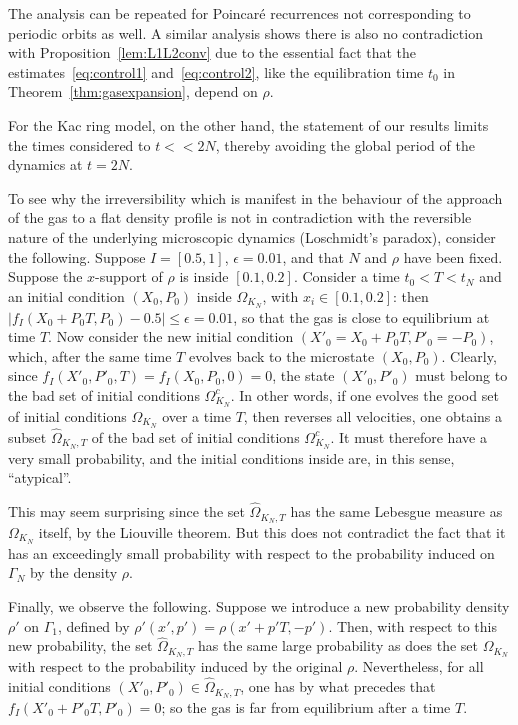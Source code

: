 \documentclass{article}
\numberwithin{equation}{section}
\begin{document}
The analysis can be repeated for Poincar\'e recurrences not corresponding to periodic orbits as well. A similar analysis shows there is also no contradiction with Proposition~\ref{lem:L1L2conv} due to the essential fact that the estimates~\eqref{eq:control1} and~\eqref{eq:control2}, like the equilibration time $t_0$ in Theorem~\ref{thm:gasexpansion}, depend on $\rho$.

For the Kac ring model, on the other hand, the statement of our results limits the times considered to $t<< 2N$, thereby avoiding the global period of the dynamics at $t=2N$.

To see why the irreversibility which is manifest in the behaviour of the approach of the gas to a flat density profile is not in contradiction with the reversible nature of the underlying microscopic dynamics (Loschmidt's paradox), consider the following. Suppose $I=[0.5, 1]$, $\epsilon=0.01$, and that $N$ and $\rho$ have been fixed. Suppose the $x$-support of $\rho$ is inside $[0.1, 0.2]$. Consider a time $t_0<T<t_N$ and an initial condition $(X_0, P_0)$ inside $\Omega_{K_N}$, with $x_i\in[0.1, 0.2]$: then $|f_I(X_0+P_0T, P_0)-0.5|\leq \epsilon=0.01$,  so that the gas is close to equilibrium at time $T$. Now consider the new initial condition $(X'_0=X_0+P_0T, P'_0=-P_0)$, which, after the same time $T$ evolves back to the microstate $(X_0, P_0)$. Clearly, since $f_I(X'_0, P'_0, T)=f_I(X_0, P_0, 0)=0$, the state $(X'_0, P'_0)$ must belong to the bad set of initial conditions $\Omega_{K_N}^c$. In other words, if one evolves the good set of initial conditions $\Omega_{K_N}$ over a time $T$, then reverses all velocities, one obtains a subset $\widehat\Omega_{K_N, T}$ of the bad set of initial conditions $\Omega^c_{K_N}$. It must therefore have a very small probability, and the initial conditions inside are, in this sense, ``atypical''.

This may seem surprising since the set $\widehat\Omega_{K_N, T}$ has the same Lebesgue measure as $\Omega_{K_N}$ itself, by the Liouville theorem. But this does not contradict the fact that it has an exceedingly small probability with respect to the probability induced on $\Gamma_N$ by the density $\rho$.

Finally, we observe the following. Suppose we introduce a new probability density$\rho'$  on $\Gamma_1$, defined by $\rho'(x',p')=\rho(x'+p'T,-p')$. Then, with respect to this new probability, the set $\widehat\Omega_{K_N, T}$ has the same large probability as does the set $\Omega_{K_N}$ with respect to the probability induced by the original $\rho$. Nevertheless, for all initial conditions $(X'_0, P'_0)\in\widehat\Omega_{K_N, T}$, one has by what precedes that $f_I(X'_0+P'_0T, P'_0)=0$; so the gas is far from equilibrium after a time $T$.
\end{document}
